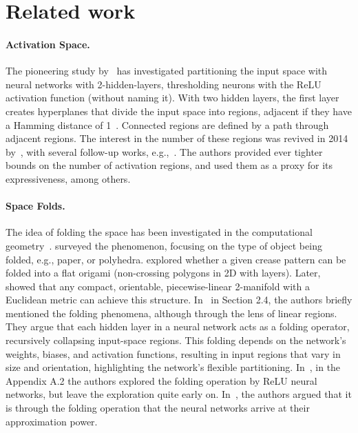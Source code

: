\section{Related work}
\label{sec:related_work}


\paragraph{Activation Space.}
The pioneering study by~\citeauthor{makhoul89firstlinearregions} has investigated  partitioning the input space with neural networks with 2-hidden-layers,  thresholding neurons with the ReLU activation function (without naming it). 
With two hidden layers, the first layer creates hyperplanes that divide the input space into regions, adjacent if they have a Hamming distance of 1~\citep{makhoul1991partitioning_capabilities}. Connected regions are defined by a path through adjacent regions.  The interest in the number of these regions was revived in 2014 by~\citeauthor{montufar2014number}, with several follow-up works, e.g.,~\citep{raghu2017expressive,serra2018bounding,xiong2020numberLR_CNN,hanin2019complexity,HaninR19reluhavefewactivation}. The authors provided ever tighter  bounds on the number of activation regions, and  used them as a proxy for its expressiveness, among others.  


\paragraph{Space Folds.} The idea of  folding the space has been investigated in the computational geometry~\citep{demaine1998folding_and_cutting}.
\citeauthor{demaine2005survey} surveyed the phenomenon, focusing on the type of object being folded, e.g., paper, or polyhedra.
\citeauthor{bern1996complexity} explored whether a given crease pattern can be folded into a flat origami (non-crossing polygons in 2D with layers). Later, \citeauthor{marshall2018origami} showed that any compact, orientable, piecewise-linear 2-manifold with a Euclidean metric can achieve this structure.
In~\cite{montufar2014number} in Section 2.4, the authors briefly mentioned the folding phenomena, although through the lens of  linear regions. They argue that each hidden layer in a neural network acts as a folding operator, recursively collapsing input-space regions. This folding depends on the network's weights, biases, and activation functions, resulting in input regions that vary in size and orientation, highlighting the network's flexible partitioning. 
In~\cite{phuong2020functional}, in the Appendix A.2 the authors explored the folding operation by ReLU neural networks, but leave the exploration quite early on.  In~\cite{keup2022origami}, the authors argued that it is through the folding operation that the neural networks arrive at their approximation power. 

